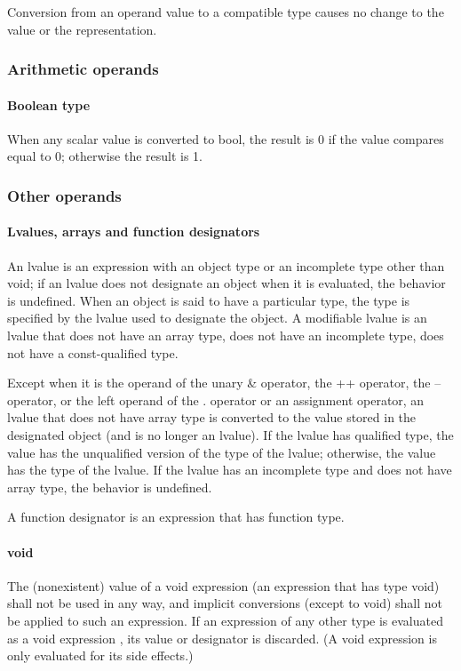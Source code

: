 \documentclass{article}
\begin{document}
Conversion from an operand value to a compatible type causes no change to the value or
the representation.
\linebreak

\subsubsection{Arithmetic operands}
\paragraph*{Boolean type}
When any scalar value is converted to bool, the result is 0 if the value compares equal 
to 0; otherwise the result is 1.

\subsubsection{Other operands}
\paragraph{Lvalues, arrays and function designators}
An lvalue is an expression with an object type or an incomplete type other than void; 
if an lvalue does not designate an object when it is evaluated, the behavior is undefined.
When an object is said to have a particular type, the type is specified by the lvalue 
used to designate the object.  A modifiable lvalue is an lvalue that does not have an 
array type, does not have an incomplete type, does not have a const-qualified type.
\linebreak

Except when it is the operand of the unary \& operator, the ++ operator, the -- operator,
or the left operand of the . operator or an assignment operator, an lvalue that does not 
have array type is converted to the value stored in the designated object (and is no 
longer an lvalue).  If the lvalue has qualified type, the value has the unqualified 
version of the type of the lvalue; otherwise, the value has the type of the lvalue. If 
the lvalue has an incomplete type and does not have array type, the behavior is undefined.
\linebreak

A function designator is an expression that has function type.
\linebreak

\paragraph*{void}
The (nonexistent) value of a void expression (an expression that has type void) shall not 
be used in any way, and implicit conversions (except to void) shall not be applied to 
such an expression.  If an expression of any other type is evaluated as a void expression
, its value or designator is discarded. (A void expression is only evaluated for its 
side effects.)
\pagebreak
\end{document}
